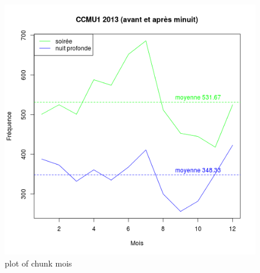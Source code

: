 \begin{figure}[htbp]
\centering
\includegraphics{figure/mois12.png}
\caption{plot of chunk mois}
\end{figure}

